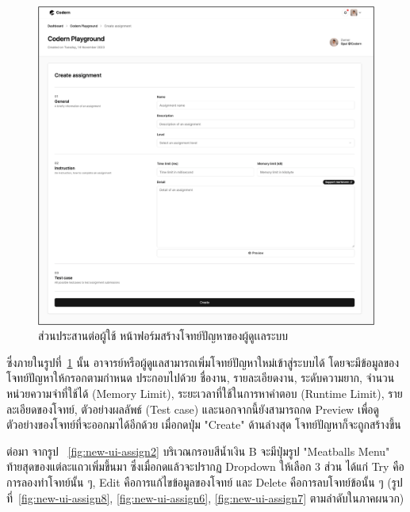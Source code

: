 \documentclass[12pt,one side,openright,a4paper]{cpe-thesis-th}
\newcommand{\thaijustify}[1]{%
  \par\hspace{30pt}\justifying
  #1
}
\begin{document}
                \begin{figure}[H]
                \centering
                \includegraphics[width=15cm]{figure/new-ui/ui-assign5.png}
                \caption[ส่วนประสานต่อผู้ใช้ หน้าฟอร์มสร้างโจทย์ปัญหา]{ส่วนประสานต่อผู้ใช้ หน้าฟอร์มสร้างโจทย์ปัญหาของผู้ดูเเลระบบ}
                \label{fig:new-ui-assign5}
                \end{figure}
                \thaijustify{
                    ซึ่งภายในรูปที่~\ref{fig:new-ui-assign5} นั้น อาจารย์หรือผู้ดูแลสามารถเพิ่มโจทย์ปัญหาใหม่เข้าสู่ระบบได้ โดยจะมีข้อมูลของโจทย์ปัญหาให้กรอกตามกำหนด ประกอบไปด้วย ชื่องาน, รายละเอียดงาน, ระดับความยาก, จำนวนหน่วยความจำที่ใช้ได้ (Memory Limit), ระยะเวลาที่ใช้ในการหาคำตอบ (Runtime Limit), รายละเอียดของโจทย์, ตัวอย่างผลลัพธ์ (Test case) และนอกจากนี้ยังสามารถกด Preview เพื่อดูตัวอย่างของโจทย์ที่จะออกมาได้อีกด้วย เมื่อกดปุ่ม "Create" ด้านล่างสุด โจทย์ปัญหาก็จะถูกสร้างขึ้น
                }
                \thaijustify{
                    ต่อมา จากรูป ~\ref{fig:new-ui-assign2} บริเวณกรอบสีน้ำเงิน B จะมีปุ่มรูป "Meatballs Menu" ท้ายสุดของแต่ละแถวเพิ่มขึ้นมา ซึ่งเมื่อกดแล้วจะปรากฏ Dropdown ให้เลือก 3 ส่วน ได้แก่ Try คือการลองทำโจทย์นั้น ๆ, Edit คือการแก้ไขข้อมูลของโจทย์ และ Delete คือการลบโจทย์ข้อนั้น ๆ (รูปที่~\ref{fig:new-ui-assign8},  \ref{fig:new-ui-assign6}, \ref{fig:new-ui-assign7} ตามลำดับในภาคผนวก)
                }
\end{document}
